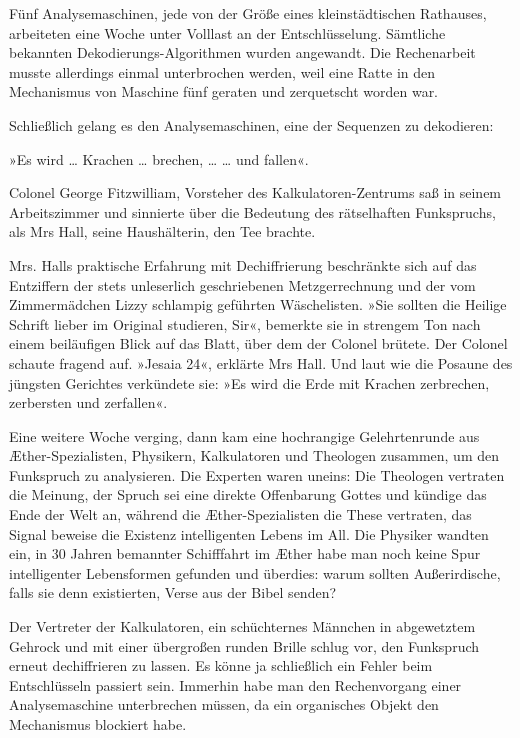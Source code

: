 \bigpar

Fünf Analysemaschinen, jede von der Größe eines kleinstädtischen
Rathauses, arbeiteten eine Woche unter Volllast an der
Entschlüsselung. Sämtliche bekannten Dekodierungs-Algorithmen
wurden angewandt. Die Rechenarbeit musste allerdings einmal
unterbrochen werden, weil eine Ratte in den Mechanismus von
Maschine fünf geraten und zerquetscht worden war.

\bigpar

Schließlich gelang es den Analysemaschinen, eine der Sequenzen zu
dekodieren:

»Es wird \ldots{} Krachen \ldots{} brechen, … \ldots{} und fallen«.

\bigpar

Colonel George Fitzwilliam, Vorsteher des Kalkulatoren-Zentrums saß
in seinem Arbeitszimmer und sinnierte über die Bedeutung des
rätselhaften Funkspruchs, als Mrs Hall, seine Haushälterin, den Tee
brachte.

Mrs. Halls praktische Erfahrung mit Dechiffrierung beschränkte sich
auf das Entziffern der stets unleserlich geschriebenen
Metzgerrechnung und der vom Zimmermädchen Lizzy schlampig geführten
Wäschelisten. »Sie sollten die Heilige Schrift lieber im Original
studieren, Sir«, bemerkte sie in strengem Ton nach einem
beiläufigen Blick auf das Blatt, über dem der Colonel brütete. Der
Colonel schaute fragend auf. »Jesaia 24«, erklärte Mrs Hall. Und
laut wie die Posaune des jüngsten Gerichtes verkündete sie: »Es
wird die Erde mit Krachen zerbrechen, zerbersten und zerfallen«.

\bigpar

Eine weitere Woche verging, dann kam eine hochrangige
Gelehrtenrunde aus Æther-Spezialisten, Physikern, Kalkulatoren und
Theologen zusammen, um den Funkspruch zu analysieren. Die Experten
waren uneins: Die Theologen vertraten die Meinung, der Spruch sei
eine direkte Offenbarung Gottes und kündige das Ende der Welt an,
während die Æther-Spezialisten die These vertraten, das Signal
beweise die Existenz intelligenten Lebens im All. Die Physiker
wandten ein, in 30 Jahren bemannter Schifffahrt im Æther habe man
noch keine Spur intelligenter Lebensformen gefunden und überdies:
warum sollten Außerirdische, falls sie denn existierten, Verse aus
der Bibel senden?

Der Vertreter der Kalkulatoren, ein schüchternes Männchen in
abgewetztem Gehrock und mit einer übergroßen runden Brille schlug
vor, den Funkspruch erneut dechiffrieren zu lassen. Es könne ja
schließlich ein Fehler beim Entschlüsseln passiert sein. Immerhin
habe man den Rechenvorgang einer Analysemaschine unterbrechen
müssen, da ein organisches Objekt den Mechanismus blockiert habe.


